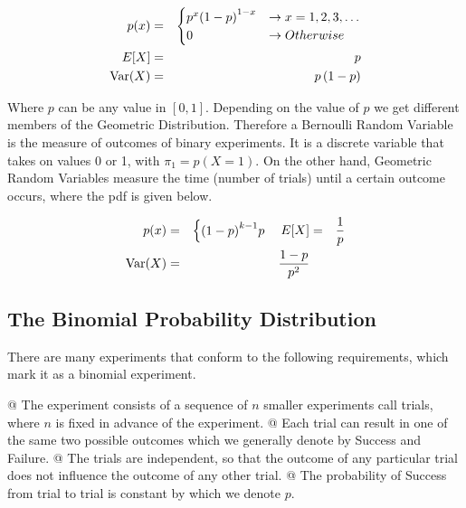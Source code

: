         \[
            \begin{aligned}
                p(x) &=& \begin{cases}
                            p^x {(1 - p)}^{1-x} &\to x = 1, 2, 3, \ldots\\
                            0 &\to Otherwise
                       \end{cases}\\
                E[X] &=& p\\
                \text{Var}(X) &=& p\left( 1 - p \right)
            \end{aligned}
        \]

    Where $p$ can be any value in $[0,1]$. Depending on the value of $p$ we get different members of the Geometric
    Distribution. Therefore a Bernoulli Random Variable is the measure of outcomes of binary experiments. It is a
    discrete variable that takes on values 0 or 1, with $\pi_1 = p(X=1)$. On the other hand, Geometric Random Variables
    measure the time (number of trials) until a certain outcome occurs, where the pdf is given below.

    \begin{equation*}
        \begin{aligned}
            p(x) &=& \begin{cases}
                        {\left( 1 - p \right)}^{k-1} p
                     \end{cases}
            E[X] &=& \frac{1}{p}\\
            \text{Var}(X) &=& \frac{1-p}{p^2}
        \end{aligned}
    \end{equation*}

    \subsection{The Binomial Probability Distribution}
    There are many experiments that conform to the following requirements, which mark it as a binomial experiment.

        \NewList
        \begin{easylist}
            @ The experiment consists of a sequence of $n$ smaller experiments call trials, where $n$ is fixed in
            advance of the experiment.
            @ Each trial can result in one of the same two possible outcomes which we generally denote by Success and
            Failure.
            @ The trials are independent, so that the outcome of any particular trial does not influence the outcome of
            any other trial.
            @ The probability of Success from trial to trial is constant by which we denote $p$.
        \end{easylist}

